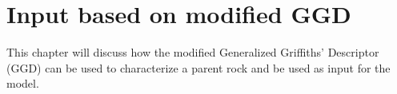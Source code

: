 \chapter{Input based on modified GGD}\label{ch:input_GGD}

This chapter will discuss how the modified Generalized Griffiths' Descriptor (GGD) can be used to characterize a parent rock and be used as input for the model. %



\cleardoublepage

